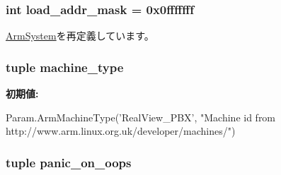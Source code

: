 \label{classArmSystem_1_1LinuxArmSystem_ac718c043f724948b038fc16de7f90860}
\hypertarget{classArmSystem_1_1LinuxArmSystem_abd9c5cc6b7da624a69344d571bab1038}{
\subsubsection[{load\_\-addr\_\-mask}]{\setlength{\rightskip}{0pt plus 5cm}int load\_\-addr\_\-mask = 0x0fffffff}}
\label{classArmSystem_1_1LinuxArmSystem_abd9c5cc6b7da624a69344d571bab1038}


\hyperlink{classArmSystem_1_1ArmSystem_abd9c5cc6b7da624a69344d571bab1038}{ArmSystem}を再定義しています。\hypertarget{classArmSystem_1_1LinuxArmSystem_a30a672590b773c4857ffd191f3f279fe}{
\subsubsection[{machine\_\-type}]{\setlength{\rightskip}{0pt plus 5cm}tuple machine\_\-type}}
\label{classArmSystem_1_1LinuxArmSystem_a30a672590b773c4857ffd191f3f279fe}
{\bfseries 初期値:}
\begin{DoxyCode}
Param.ArmMachineType('RealView_PBX',
        "Machine id from http://www.arm.linux.org.uk/developer/machines/")
\end{DoxyCode}
\hypertarget{classArmSystem_1_1LinuxArmSystem_a8578823f13862675c5afca849c58d129}{
\subsubsection[{panic\_\-on\_\-oops}]{\setlength{\rightskip}{0pt plus 5cm}tuple panic\_\-on\_\-oops}}
\label{classArmSystem_1_1LinuxArmSystem_a8578823f13862675c5afca849c58d129}
